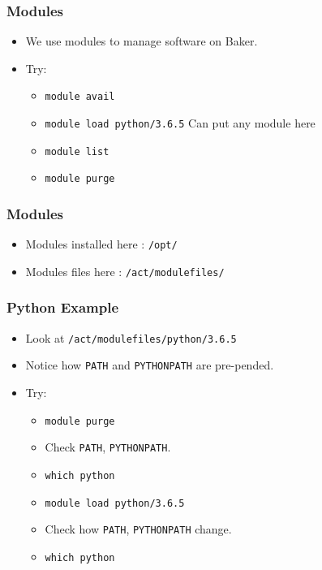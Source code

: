 \documentclass{beamer}
\newcommand{\code}[1]{\colorbox{codegray}{\texttt{#1}}}
\begin{document}
\begin{frame}
\frametitle{Modules}
\begin{itemize}
    \item We use modules to manage software on Baker.
    \pause
    \bigskip
    \item Try:
    \pause
    \begin{itemize}
        \item \code{module avail}
        \bigskip
        \pause
        \item \code{module load python/3.6.5}  Can put any module here
        \bigskip
        \pause
        \item \code{module list}
        \bigskip
        \pause
        \item \code{module purge}
    \end{itemize}
\end{itemize}
\end{frame}


\begin{frame}
\frametitle{Modules}
\begin{itemize}
    \item Modules installed here : \code{/opt/}
    \pause
    \bigskip
    \item Modules files here : \code{/act/modulefiles/}
\end{itemize}
\end{frame}






\begin{frame}
\frametitle{Python Example}
\begin{itemize}
    \item Look at \code{/act/modulefiles/python/3.6.5}
    \pause
    \item Notice how \code{PATH} and \code{PYTHONPATH} are pre-pended.
    \pause
    \item Try:
    \begin{itemize}
        \item \code{module purge}
        \pause
        \item Check \code{PATH}, \code{PYTHONPATH}.
        \pause
        \item \code{which python}
        \pause
        \item \code{module load python/3.6.5}
        \pause
        \item Check how \code{PATH}, \code{PYTHONPATH} change.
        \pause
        \item \code{which python}
    \end{itemize}
\end{itemize}
\end{frame}
\end{document}
